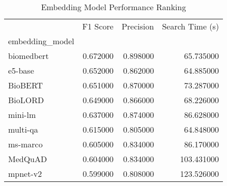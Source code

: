\begin{table}
\caption{Embedding Model Performance Ranking}
\label{tab:embedding_ranking}
\begin{tabular}{lrrr}
\toprule
 & F1 Score & Precision & Search Time (s) \\
embedding_model &  &  &  \\
\midrule
biomedbert & 0.672000 & 0.898000 & 65.735000 \\
e5-base & 0.652000 & 0.862000 & 64.885000 \\
BioBERT & 0.651000 & 0.870000 & 73.287000 \\
BioLORD & 0.649000 & 0.866000 & 68.226000 \\
mini-lm & 0.637000 & 0.874000 & 86.628000 \\
multi-qa & 0.615000 & 0.805000 & 64.848000 \\
ms-marco & 0.605000 & 0.834000 & 86.170000 \\
MedQuAD & 0.604000 & 0.834000 & 103.431000 \\
mpnet-v2 & 0.599000 & 0.808000 & 123.526000 \\
\bottomrule
\end{tabular}
\end{table}
